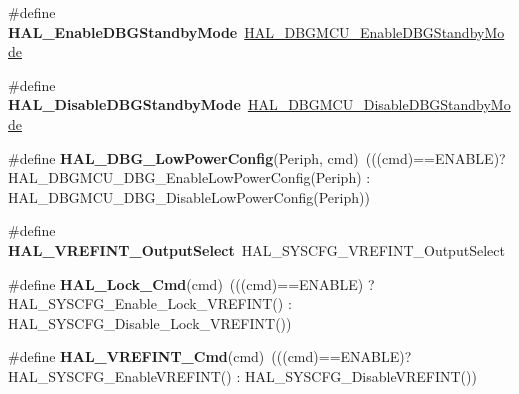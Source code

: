 \begin{DoxyCompactItemize}
\#define {\bfseries H\+A\+L\+\_\+\+Enable\+D\+B\+G\+Standby\+Mode}~\mbox{\hyperlink{group___h_a_l___exported___functions___group2_ga28a1323b2eeb0a408c1cfdbfa0db5ead}{H\+A\+L\+\_\+\+D\+B\+G\+M\+C\+U\+\_\+\+Enable\+D\+B\+G\+Standby\+Mode}}
\item 
\mbox{\label{group___h_a_l___aliased___functions_gac17bfe5c0df5508f778b7f3784b9723a}} 
\#define {\bfseries H\+A\+L\+\_\+\+Disable\+D\+B\+G\+Standby\+Mode}~\mbox{\hyperlink{group___h_a_l___exported___functions___group2_ga7faa58d8508ea3123b9f247a70379779}{H\+A\+L\+\_\+\+D\+B\+G\+M\+C\+U\+\_\+\+Disable\+D\+B\+G\+Standby\+Mode}}
\item 
\mbox{\label{group___h_a_l___aliased___functions_gaeece8fd3268534ce330c635222ce79a3}} 
\#define {\bfseries H\+A\+L\+\_\+\+D\+B\+G\+\_\+\+Low\+Power\+Config}(Periph,  cmd)~(((cmd)==E\+N\+A\+B\+LE)? H\+A\+L\+\_\+\+D\+B\+G\+M\+C\+U\+\_\+\+D\+B\+G\+\_\+\+Enable\+Low\+Power\+Config(Periph) \+: H\+A\+L\+\_\+\+D\+B\+G\+M\+C\+U\+\_\+\+D\+B\+G\+\_\+\+Disable\+Low\+Power\+Config(Periph))
\item 
\mbox{\label{group___h_a_l___aliased___functions_ga2c3d2cdc9071cfc99696e78c29621852}} 
\#define {\bfseries H\+A\+L\+\_\+\+V\+R\+E\+F\+I\+N\+T\+\_\+\+Output\+Select}~H\+A\+L\+\_\+\+S\+Y\+S\+C\+F\+G\+\_\+\+V\+R\+E\+F\+I\+N\+T\+\_\+\+Output\+Select
\item 
\mbox{\label{group___h_a_l___aliased___functions_ga72384357565be710258691efd3b3b72c}} 
\#define {\bfseries H\+A\+L\+\_\+\+Lock\+\_\+\+Cmd}(cmd)~(((cmd)==E\+N\+A\+B\+LE) ? H\+A\+L\+\_\+\+S\+Y\+S\+C\+F\+G\+\_\+\+Enable\+\_\+\+Lock\+\_\+\+V\+R\+E\+F\+I\+NT() \+: H\+A\+L\+\_\+\+S\+Y\+S\+C\+F\+G\+\_\+\+Disable\+\_\+\+Lock\+\_\+\+V\+R\+E\+F\+I\+NT())
\item 
\mbox{\label{group___h_a_l___aliased___functions_ga89195eed3652b3f7ce36e89f3cc8e3a6}} 
\#define {\bfseries H\+A\+L\+\_\+\+V\+R\+E\+F\+I\+N\+T\+\_\+\+Cmd}(cmd)~(((cmd)==E\+N\+A\+B\+LE)? H\+A\+L\+\_\+\+S\+Y\+S\+C\+F\+G\+\_\+\+Enable\+V\+R\+E\+F\+I\+NT() \+: H\+A\+L\+\_\+\+S\+Y\+S\+C\+F\+G\+\_\+\+Disable\+V\+R\+E\+F\+I\+NT())
\item 
\mbox{\label{group___h_a_l___aliased___functions_ga2945c26e7b184a3ee89309906de33cd3}} 

\end{DoxyCompactItemize}
